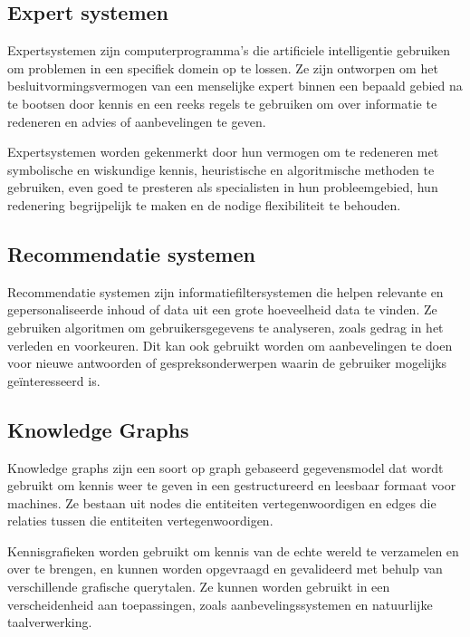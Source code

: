 \cite{voulodimos2018deep}

\subsection{Expert systemen}

Expertsystemen zijn computerprogramma's die artificiele intelligentie gebruiken om problemen in een specifiek domein op te lossen. Ze zijn ontworpen om het besluitvormingsvermogen van een menselijke expert binnen een bepaald gebied na te bootsen door kennis en een reeks regels te gebruiken om over informatie te redeneren en advies of aanbevelingen te geven. 

Expertsystemen worden gekenmerkt door hun vermogen om te redeneren met symbolische en wiskundige kennis, heuristische en algoritmische methoden te gebruiken, even goed te presteren als specialisten in hun probleemgebied, hun redenering begrijpelijk te maken en de nodige flexibiliteit te behouden.

\cite{buchanan1988fundamentals}

\subsection{Recommendatie systemen}

Recommendatie systemen zijn informatiefiltersystemen die helpen relevante en gepersonaliseerde inhoud of data uit een grote hoeveelheid data te vinden. Ze gebruiken algoritmen om gebruikersgegevens te analyseren, zoals gedrag in het verleden en voorkeuren. Dit kan ook gebruikt worden om aanbevelingen te doen voor nieuwe antwoorden of gespreksonderwerpen waarin de gebruiker mogelijks geïnteresseerd is.

\cite{isinkaye2015recommendation}

\subsection{Knowledge Graphs}

Knowledge graphs zijn een soort op graph gebaseerd gegevensmodel dat wordt gebruikt om kennis weer te geven in een gestructureerd en leesbaar formaat voor machines. Ze bestaan uit nodes die entiteiten vertegenwoordigen en edges die relaties tussen die entiteiten vertegenwoordigen. 

Kennisgrafieken worden gebruikt om kennis van de echte wereld te verzamelen en over te brengen, en kunnen worden opgevraagd en gevalideerd met behulp van verschillende grafische querytalen. Ze kunnen worden gebruikt in een verscheidenheid aan toepassingen, zoals aanbevelingssystemen en natuurlijke taalverwerking.

